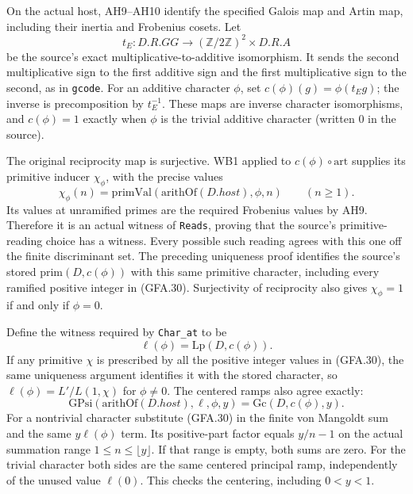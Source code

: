 On the actual host, AH9--AH10 identify the specified Galois
map and Artin map, including their inertia and Frobenius
cosets.  Let
\[
 t_E:D.R.GG\longrightarrow(\mathbb Z/2\mathbb Z)^2\times D.R.A
\]
be the source's exact multiplicative-to-additive isomorphism.
It sends the second multiplicative sign to the first additive
sign and the first multiplicative sign to the second, as in
\texttt{gcode}.  For an additive character $\phi$, set
$c(\phi)(g)=\phi(t_Eg)$; the inverse is precomposition by
$t_E^{-1}$.  These maps are inverse character isomorphisms,
and $c(\phi)=1$ exactly when $\phi$ is the trivial additive
character (written $0$ in the source).

The original reciprocity map is surjective.  WB1 applied to
$c(\phi)\circ\mathrm{art}$ supplies its primitive inducer
$\chi_\phi$, with the precise values
\[
 \chi_\phi(n)=\mathrm{primVal}(\mathrm{arithOf}(D.host),\phi,n)
 \qquad(n\ge1).                                           \tag{GFA.30}
\]
Its values at unramified primes are the required Frobenius
values by AH9.  Therefore it is an actual witness of
\texttt{Reads}, proving that the source's primitive-reading
choice has a witness.  Every possible such reading agrees
with this one off the finite discriminant set.  The preceding
uniqueness proof identifies the source's stored
$\mathrm{prim}(D,c(\phi))$ with this same primitive character,
including every ramified positive integer in (GFA.30).
Surjectivity of reciprocity also gives
$\chi_\phi=1$ if and only if $\phi=0$.

Define the witness required by \texttt{Char\_at} to be
\[
 \ell(\phi)=\mathrm{Lp}(D,c(\phi)).
\]
If any primitive $\chi$ is prescribed by all the positive
integer values in (GFA.30), the same uniqueness argument
identifies it with the stored character, so
$\ell(\phi)=L'/L(1,\chi)$ for $\phi\ne0$.
The centered ramps also agree exactly:
\[
 \mathrm{GPsi}(\mathrm{arithOf}(D.host),\ell,\phi,y)
       =\mathrm{Gc}(D,c(\phi),y).                           \tag{GFA.31}
\]
For a nontrivial character substitute (GFA.30) in the finite
von Mangoldt sum and the same $y\ell(\phi)$ term.  Its
positive-part factor equals $y/n-1$ on the actual summation
range $1\le n\le\lfloor y\rfloor$.  If that range is empty,
both sums are zero.  For the trivial character both sides
are the same centered principal ramp, independently of the
unused value $\ell(0)$.  This checks the centering, including
$0<y<1$.

